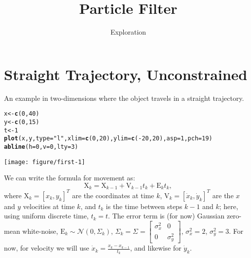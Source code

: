 \documentclass[11pt]{article}\usepackage[]{graphicx}\usepackage[]{color}
\title{Particle Filter}
\author{Exploration}
\date{}
\makeatletter
\def\maxwidth{ %
  \ifdim\Gin@nat@width>\linewidth
    \linewidth
  \else
    \Gin@nat@width
  \fi
}
\newcommand{\hlnum}[1]{\textcolor[rgb]{0.686,0.059,0.569}{#1}}%
\newcommand{\hlstr}[1]{\textcolor[rgb]{0.192,0.494,0.8}{#1}}%
\newcommand{\hlopt}[1]{\textcolor[rgb]{0,0,0}{#1}}%
\newcommand{\hlstd}[1]{\textcolor[rgb]{0.345,0.345,0.345}{#1}}%
\newcommand{\hlkwb}[1]{\textcolor[rgb]{0.69,0.353,0.396}{#1}}%
\newcommand{\hlkwc}[1]{\textcolor[rgb]{0.333,0.667,0.333}{#1}}%
\newcommand{\hlkwd}[1]{\textcolor[rgb]{0.737,0.353,0.396}{\textbf{#1}}}%
\newenvironment{kframe}{%
 \def\at@end@of@kframe{}%
 \ifinner\ifhmode%
  \def\at@end@of@kframe{\end{minipage}}%
  \begin{minipage}{\columnwidth}%
 \fi\fi%
 \def\FrameCommand##1{\hskip\@totalleftmargin \hskip-\fboxsep
 \colorbox{shadecolor}{##1}\hskip-\fboxsep
     \hskip-\linewidth \hskip-\@totalleftmargin \hskip\columnwidth}%
 \MakeFramed {\advance\hsize-\width
   \@totalleftmargin\z@ \linewidth\hsize
   \@setminipage}}%
 {\par\unskip\endMakeFramed%
 \at@end@of@kframe}
\newenvironment{knitrout}{}{} %
\newcommand{\X}{\mathrm{X}}
\newcommand{\E}{\mathrm{E}}
\newcommand{\V}{\mathrm{V}}
\makeatother
\begin{document}
\maketitle


\section{Straight Trajectory, Unconstrained}

An example in two-dimensions where the object travels in a straight trajectory. 


\begin{knitrout}
\color{fgcolor}\begin{kframe}
\begin{alltt}
\hlstd{x} \hlkwb{<-} \hlkwd{c}\hlstd{(}\hlnum{0}\hlstd{,} \hlnum{40}\hlstd{)}
\hlstd{y} \hlkwb{<-} \hlkwd{c}\hlstd{(}\hlnum{0}\hlstd{,} \hlnum{15}\hlstd{)}
\hlstd{t} \hlkwb{<-} \hlnum{1}
\hlkwd{plot}\hlstd{(x, y,} \hlkwc{type} \hlstd{=} \hlstr{"l"}\hlstd{,} \hlkwc{xlim} \hlstd{=} \hlkwd{c}\hlstd{(}\hlnum{0}\hlstd{,} \hlnum{20}\hlstd{),} \hlkwc{ylim} \hlstd{=} \hlkwd{c}\hlstd{(}\hlopt{-}\hlnum{20}\hlstd{,} \hlnum{20}\hlstd{),} \hlkwc{asp} \hlstd{=} \hlnum{1}\hlstd{,} \hlkwc{pch} \hlstd{=} \hlnum{19}\hlstd{)}
\hlkwd{abline}\hlstd{(}\hlkwc{h} \hlstd{=} \hlnum{0}\hlstd{,} \hlkwc{v} \hlstd{=} \hlnum{0}\hlstd{,} \hlkwc{lty} \hlstd{=} \hlnum{3}\hlstd{)}
\end{alltt}
\end{kframe}

{\centering \texttt{[image: figure/first-1]} 

}



\end{knitrout}

We can write the formula for movement as:
\begin{equation}
  \label{eq:straight_state}
  \X_k = \X_{k-1} + \V_{k-1}t_{k} + \E_kt_{k},
\end{equation}
where 
$\X_k = \left[x_k, y_k\right]^T$ are the coordinates at time $k$,
$\V_k = \left[\dot x_k, \dot y_k\right]^T$ are the $x$ and $y$ velocities at time $k$,
and $t_k$ is the time between steps $k-1$ and $k$; here, using uniform discrete time, $t_k = t$.
The error term is (for now) Gaussian zero-mean white-noise, $\E_k \sim \mathcal{N}\left(0, \Sigma_k\right)$,
$\Sigma_k = \Sigma =
\begin{bmatrix}
  \sigma_x^2 & 0 \\ 0 & \sigma_y^2
\end{bmatrix}$,
$\sigma_x^2 = 2$, $\sigma_y^2 = 3$.
For now, for velocity we will use $\dot x_k = \frac{x_k - x_{k-1}}{t_k}$, and likewise for $\dot y_k$.
\end{document}
